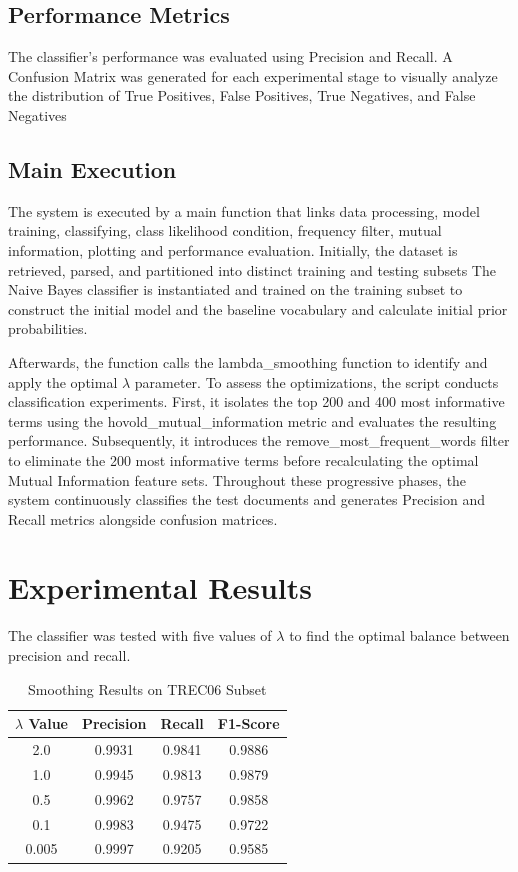 \documentclass{acm_proc_article-sp}
\begin{document}
\subsection{Performance Metrics}
The classifier's performance was evaluated using Precision and Recall. A Confusion Matrix was generated for each experimental stage to visually analyze the distribution of True Positives, False Positives, True Negatives, and False Negatives

\subsection{Main Execution}
The system is executed by a main function that links data processing, model training, classifying, class likelihood condition, frequency filter, mutual information, plotting and performance evaluation. Initially, the dataset is retrieved, parsed, and partitioned into distinct training and testing subsets The Naive Bayes classifier is instantiated and trained on the training subset to construct the initial model and the baseline vocabulary and calculate initial prior probabilities. 

Afterwards, the function calls the lambda\_smoothing function to identify and apply the optimal $\lambda$ parameter. To assess the optimizations, the script conducts classification experiments. First, it isolates the top 200 and 400 most informative terms using the hovold\_mutual\_information metric and evaluates the resulting performance. Subsequently, it introduces the remove\_most\_frequent\_words filter to eliminate the 200 most informative terms before recalculating the optimal Mutual Information feature sets.  Throughout these progressive phases, the system continuously classifies the test documents and generates Precision and Recall metrics alongside confusion matrices.

\section{Experimental Results}
The classifier was tested with five values of $\lambda$ to find the optimal balance between precision and recall.

\begin{table}[H]
\centering
\caption{Smoothing Results on TREC06 Subset}
\begin{tabular}{|c|c|c|c|}
\hline
$\lambda$ Value & Precision & Recall & F1-Score\\ \hline
2.0 & 0.9931 & 0.9841 & 0.9886\\ \hline
1.0 & 0.9945 & 0.9813 & 0.9879\\ \hline
0.5 & 0.9962 & 0.9757 & 0.9858\\ \hline
0.1 & 0.9983 & 0.9475 & 0.9722\\ \hline
0.005 & 0.9997 & 0.9205 & 0.9585\\ \hline
\end{tabular}
\end{table}
\end{document}
